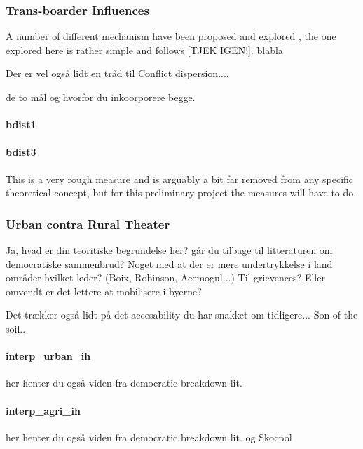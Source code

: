 \documentclass[a4paper]{article}
\begin{document}


\subsubsection{Trans-boarder Influences} %

A number of different mechanism have been proposed and explored \citep[29-30]{Blattman_Miguel_2010}, the one explored here is rather simple and follows \cite{Hegre_Sambanis_2006} [TJEK IGEN!]. blabla

Der er vel også lidt en tråd til Conflict dispersion....

de to mål og hvorfor du inkoorporere begge.

\paragraph{bdist1}  
\paragraph{bdist3}


This is a very rough measure and is arguably a bit far removed from any specific theoretical concept, but for this preliminary project the measures will have to do.

\subsubsection{Urban contra Rural Theater} %

Ja, hvad er din teoritiske begrundelse her? går du tilbage til litteraturen om democratiske sammenbrud? Noget med at der er mere undertrykkelse i land områder hvilket leder? (Boix, Robinson, Acemogul...) Til grievences? Eller omvendt er det lettere at mobilisere i byerne?

Det trækker også lidt på det accesability du har snakket om tidligere... Son of the soil..

\paragraph{interp\_urban\_ih} her henter du også viden fra democratic breakdown lit.  
\paragraph{interp\_agri\_ih}  her henter du også viden fra democratic breakdown lit.  og Skocpol
\end{document}
